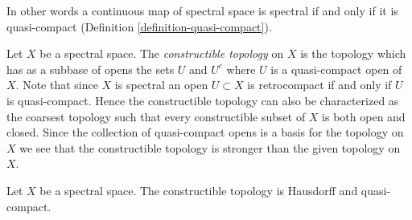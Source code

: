 \noindent
In other words a continuous map of spectral space is spectral if and
only if it is quasi-compact (Definition \ref{definition-quasi-compact}).

\medskip\noindent
Let $X$ be a spectral space. The {\it constructible topology} on $X$
is the topology which has as a subbase of opens the sets $U$ and $U^c$
where $U$ is a quasi-compact open of $X$. Note that since $X$ is spectral
an open $U \subset X$ is retrocompact if and only if $U$ is quasi-compact.
Hence the constructible topology can also be characterized as the coarsest
topology such that every constructible subset of $X$ is both open and closed.
Since the collection of quasi-compact opens is a basis for the topology
on $X$ we see that the constructible topology is stronger than the
given topology on $X$.

\begin{lemma}
\label{lemma-constructible-hausdorff-quasi-compact}
Let $X$ be a spectral space. The constructible topology is
Hausdorff and quasi-compact.
\end{lemma}

